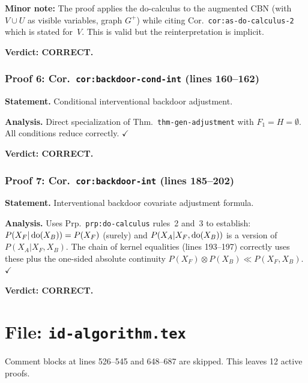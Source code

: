 \documentclass{article}
\begin{document}
\textbf{Minor note:} The proof applies the do-calculus to the augmented CBN
(with $V\cup U$ as visible variables, graph $G^+$) while citing
Cor.\ \texttt{cor:as-do-calculus-2} which is stated for~$V$.  This is valid
but the reinterpretation is implicit.

\textbf{Verdict: CORRECT.}

\section{Proof 6: Cor.\ \texttt{cor:backdoor-cond-int} (lines 160--162)}

\textbf{Statement.} Conditional interventional backdoor adjustment.

\textbf{Analysis.}
Direct specialization of Thm.\ \texttt{thm-gen-adjustment} with
$F_1=H=\emptyset$.  All conditions reduce correctly.  $\checkmark$

\textbf{Verdict: CORRECT.}

\section{Proof 7: Cor.\ \texttt{cor:backdoor-int} (lines 185--202)}

\textbf{Statement.} Interventional backdoor covariate adjustment formula.

\textbf{Analysis.}
Uses Prp.\ \texttt{prp:do-calculus} rules~2 and~3 to establish:
$P(X_F|\operatorname{do}(X_B))=P(X_F)$ (surely) and
$P(X_A|X_F,\operatorname{do}(X_B))$ is a version of $P(X_A|X_F,X_B)$.
The chain of kernel equalities (lines 193--197) correctly uses these plus
the one-sided absolute continuity $P(X_F)\otimes P(X_B)\ll P(X_F,X_B)$.
$\checkmark$

\textbf{Verdict: CORRECT.}

\part*{File: \texttt{id-algorithm.tex}}

Comment blocks at lines 526--545 and 648--687 are skipped.
This leaves 12 active proofs.
\end{document}
